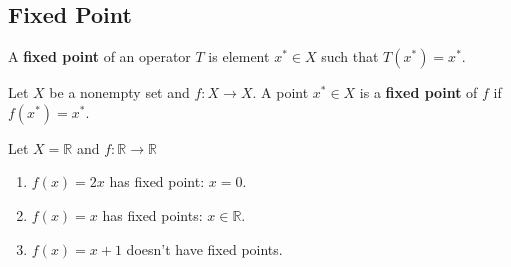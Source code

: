 \documentclass[11pt]{elegantbook}
\begin{document}
\subsection{Fixed Point}
\begin{definition}
    \normalfont
    A \textbf{fixed point} of an operator $T$ is element $x^*\in X$ such that $T(x^*)=x^*$.
\end{definition}

\begin{definition}
    \normalfont
    Let $X$ be a nonempty set and $f : X \rightarrow X$. A point $x^* \in X$ is a \textbf{fixed point} of $f$ if $f(x^*) = x^*$.
\end{definition}

\begin{example}
    Let $X=\mathbb{R}$ and $f: \mathbb{R} \rightarrow \mathbb{R}$
    \begin{enumerate}
        \item $f(x)=2x$ has fixed point: $x=0$.
        \item $f(x)=x$ has fixed points: $x\in \mathbb{R}$.
        \item $f(x)=x+1$ doesn't have fixed points.
    \end{enumerate}
\end{example}
\end{document}
